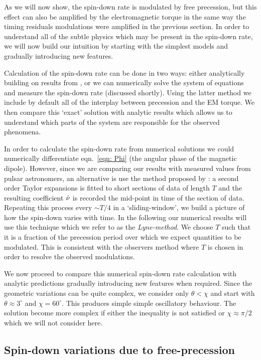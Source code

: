 \documentclass[../full_thesis/full_thesis.tex]{subfiles}
\begin{document}
As we will now show, the spin-down rate is modulated by free precession, but
this effect can also be amplified by the electromagnetic torque in the same way
the timing residuals modulations were amplified in the previous section.
In order to understand all of the subtle physics which
may be present in the spin-down rate, we will now build our intuition by starting
with the simplest models and gradually introducing new features.

Calculation of the spin-down rate can be done in two ways: either analytically
building on results from \citet{Jones2001}, or we can numerically solve the
system of equations and measure the spin-down rate (discussed shortly). Using the
latter method we include by default all of the interplay between precession and
the EM torque. We then compare this `exact' solution with analytic results
which allows us to understand which parts of the system are responsible for the
observed phenomena.

In order to calculate the spin-down rate from numerical solutions we could
numerically differentiate eqn.~\eqref{eqn: Phi} (the angular phase of the
magnetic dipole). However, since we are comparing our results with measured
values from pulsar astronomers, an alternative is use the method proposed by
\citet{Lyne2010}: a second order Taylor expansions is fitted to short sections
of data of length $T$ and the resulting coefficient $\dot{\nu}$ is recorded the
mid-point in time of the section of data. Repeating this process every $\sim
T/4$ in a `sliding-window', we build a picture of how the spin-down varies with time.
In the following our numerical results will use this technique which we refer
to as the \emph{Lyne-method}.
We choose $T$ such that it is a fraction of the precession period over which we
expect quantities to be modulated. This is consistent with the observers method
where $T$ is chosen in order to resolve the observed modulations.

We now proceed to compare this numerical spin-down rate calculation with analytic
predictions gradually introducing new features when required. Since the geometric
variations can be quite complex, we consider only $\theta < \chi$ and start
with $\theta \approx 3^{\circ}$ and $\chi=60^{\circ}$. This produces simple
simple oscillatory behaviour. The solution become more complex if either
the inequality is not satisfied or $\chi \approx \pi/2$ which we will not
consider here.

\subsection{Spin-down variations due to free-precession}
\label{sec: spin-down free precession}
\end{document}

